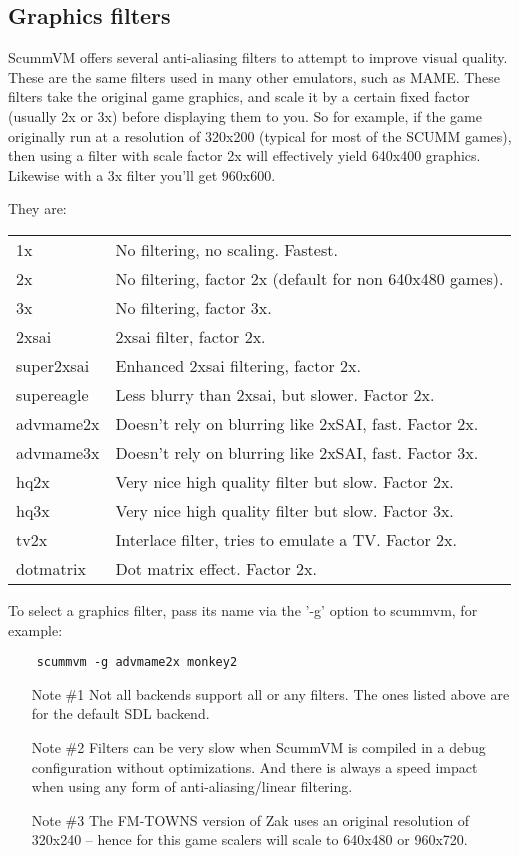 

\subsection {Graphics filters} \label{sect-gfx-filters}
ScummVM offers several anti-aliasing filters to attempt to improve visual
quality. These are the same filters used in many other emulators, such as
MAME. These filters take the original game graphics, and scale it by a 
certain fixed factor (usually 2x or 3x) before displaying them to you.
So for example, if the game originally run at a resolution of 320x200
(typical for most of the SCUMM games), then using a filter with scale
factor 2x will effectively yield 640x400 graphics. Likewise with a 
3x filter you'll get 960x600.

They are:\\
\begin{tabular}[h]{ll}
  1x         & No filtering, no scaling. Fastest.\\
  2x         & No filtering, factor 2x (default for non 640x480 games).\\
  3x         & No filtering, factor 3x.\\
  2xsai      & 2xsai filter, factor 2x.\\
  super2xsai & Enhanced 2xsai filtering, factor 2x.\\
  supereagle & Less blurry than 2xsai, but slower. Factor 2x.\\
  advmame2x  & Doesn't rely on blurring like 2xSAI, fast. Factor 2x.\\
  advmame3x  & Doesn't rely on blurring like 2xSAI, fast. Factor 3x.\\
  hq2x       & Very nice high quality filter but slow. Factor 2x.\\
  hq3x       & Very nice high quality filter but slow. Factor 3x.\\
  tv2x       & Interlace filter, tries to emulate a TV. Factor 2x.\\
  dotmatrix  & Dot matrix effect. Factor 2x.\\
\end{tabular}

To select a graphics filter, pass its name via the '-g' option to scummvm,
for example:

\begin{verbatim}
    scummvm -g advmame2x monkey2
\end{verbatim}
\begin{enumerate}
\item [Note \#1] Not all backends support all or any filters. The ones
  listed above are for the default SDL backend.
\item [Note \#2] Filters can be very slow when ScummVM is compiled in a
  debug configuration without optimizations. And there is always a
  speed impact when using any form of anti-aliasing/linear filtering.
\item [Note \#3] The FM-TOWNS version of Zak uses an
  original resolution of 320x240 -- hence for this game scalers will
  scale to 640x480 or 960x720.
\end{enumerate}
